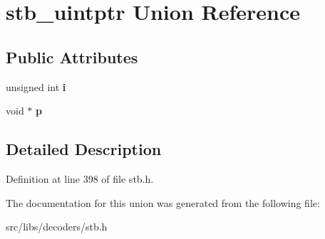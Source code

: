 \hypertarget{unionstb__uintptr}{\section{stb\-\_\-uintptr Union Reference}
\label{unionstb__uintptr}
}
\subsection*{Public Attributes}
\begin{DoxyCompactItemize}
\item 
\hypertarget{unionstb__uintptr_a160136653749a4a642c5db8116604f22}{unsigned int {\bfseries i}}\label{unionstb__uintptr_a160136653749a4a642c5db8116604f22}

\item 
\hypertarget{unionstb__uintptr_aee3334a3b5b120d1179c07e911508f4f}{void $\ast$ {\bfseries p}}\label{unionstb__uintptr_aee3334a3b5b120d1179c07e911508f4f}

\end{DoxyCompactItemize}


\subsection{Detailed Description}


Definition at line 398 of file stb.\-h.



The documentation for this union was generated from the following file\-:\begin{DoxyCompactItemize}
\item 
src/libs/decoders/stb.\-h\end{DoxyCompactItemize}
